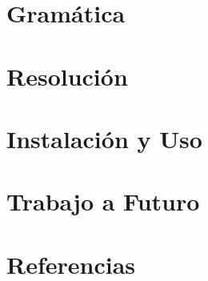 \documentclass[11pt]{article}
\begin{document}
\section{Gramática}

\section{Resolución}

\section{Instalación y Uso}

\section{Trabajo a Futuro}

\section{Referencias}
\end{document}
